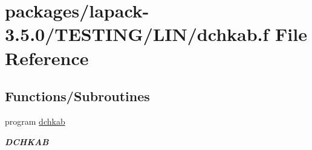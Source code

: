 \hypertarget{dchkab_8f}{}\section{packages/lapack-\/3.5.0/\+T\+E\+S\+T\+I\+N\+G/\+L\+I\+N/dchkab.f File Reference}
\label{dchkab_8f}
\subsection*{Functions/\+Subroutines}
\begin{DoxyCompactItemize}
\item 
program \hyperlink{group__double__lin_ga16d0ca73ea4d778d7bd902594f40193f}{dchkab}
\begin{DoxyCompactList}\small\item\em {\bfseries D\+C\+H\+K\+A\+B} \end{DoxyCompactList}\end{DoxyCompactItemize}
